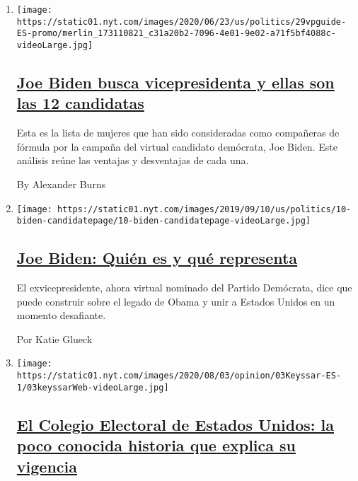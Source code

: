 \begin{enumerate}
\def\labelenumi{\arabic{enumi}.}
\item
  \texttt{[image: https://static01.nyt.com/images/2020/06/23/us/politics/29vpguide-ES-promo/merlin\_173110821\_c31a20b2-7096-4e01-9e02-a71f5bf4088c-videoLarge.jpg]}

  \hypertarget{joe-biden-busca-vicepresidenta-y-ellas-son-las-12-candidatas}{%
  \subsection{\texorpdfstring{\href{/es/2020/07/29/espanol/estados-unidos/biden-vicepresidente.html}{Joe
  Biden busca vicepresidenta y ellas son las 12
  candidatas}}{Joe Biden busca vicepresidenta y ellas son las 12 candidatas}}\label{joe-biden-busca-vicepresidenta-y-ellas-son-las-12-candidatas}}

  Esta es la lista de mujeres que han sido consideradas como compañeras
  de fórmula por la campaña del virtual candidato demócrata, Joe Biden.
  Este análisis reúne las ventajas y desventajas de cada una.

  By Alexander Burns
\item
  \texttt{[image: https://static01.nyt.com/images/2019/09/10/us/politics/10-biden-candidatepage/10-biden-candidatepage-videoLarge.jpg]}

  \hypertarget{joe-biden-quiuxe9n-es-y-quuxe9-representa}{%
  \subsection{\texorpdfstring{\href{/es/interactive/2020/espanol/estados-unidos/joe-biden-elecciones.html}{Joe
  Biden: Quién es y qué
  representa}}{Joe Biden: Quién es y qué representa}}\label{joe-biden-quiuxe9n-es-y-quuxe9-representa}}

  El exvicepresidente, ahora virtual nominado del Partido Demócrata,
  dice que puede construir sobre el legado de Obama y unir a Estados
  Unidos en un momento desafiante.

  Por Katie Glueck
\item
  \texttt{[image: https://static01.nyt.com/images/2020/08/03/opinion/03Keyssar-ES-1/03keyssarWeb-videoLarge.jpg]}

  \hypertarget{el-colegio-electoral-de-estados-unidos-la-poco-conocida-historia-que-explica-su-vigencia}{%
  \subsection{\texorpdfstring{\href{/es/2020/08/03/espanol/opinion/colegio-electoral-estados-unidos.html}{El
  Colegio Electoral de Estados Unidos: la poco conocida historia que
  explica su
  vigencia}}{El Colegio Electoral de Estados Unidos: la poco conocida historia que explica su vigencia}}\label{el-colegio-electoral-de-estados-unidos-la-poco-conocida-historia-que-explica-su-vigencia}}


\end{enumerate}
